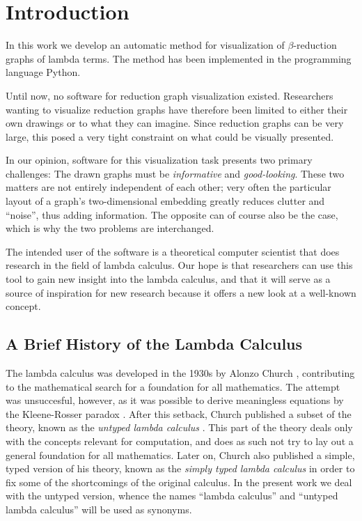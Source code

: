 
\chapter{Introduction}

In this work we develop an automatic method for visualization of
$\beta$-reduction graphs of lambda terms. The method has been implemented in
the programming language Python.

Until now, no software for reduction graph visualization existed. Researchers
wanting to visualize reduction graphs have therefore been limited to either
their own drawings or to what they can imagine. Since reduction graphs can be
very large, this posed a very tight constraint on what could be visually
presented.

In our opinion, software for this visualization task presents two primary
challenges: The drawn graphs must be \emph{informative} and
\emph{good-looking}. These two matters are not entirely independent of each
other; very often the particular layout of a graph's two-dimensional embedding
greatly reduces clutter and ``noise'', thus adding information. The opposite
can of course also be the case, which is why the two problems are
interchanged.

The intended user of the software is a theoretical computer scientist that
does research in the field of lambda calculus. Our hope is that researchers
can use this tool to gain new insight into the lambda calculus, and that it
will serve as a source of inspiration for new research because it offers a new
look at a well-known concept.

\section{A Brief History of the Lambda Calculus}

The lambda calculus was developed in the 1930s by Alonzo Church
\cite{Church1932}, contributing to the mathematical search for a foundation
for all mathematics. The attempt was unsuccesful, however, as it was possible
to derive meaningless equations by the Kleene-Rosser paradox
\cite{KleeneRosser1935}. After this setback, Church published a subset of the
theory, known as the \emph{untyped lambda calculus} \cite{Church1936}. This
part of the theory deals only with the concepts relevant for computation, and
does as such not try to lay out a general foundation for all mathematics.
Later on, Church also published a simple, typed version of his theory, known
as the \emph{simply typed lambda calculus} \cite{Church1940} in order to fix
some of the shortcomings of the original calculus. In the present work we deal
with the untyped version, whence the names ``lambda calculus'' and ``untyped
lambda calculus'' will be used as synonyms.

